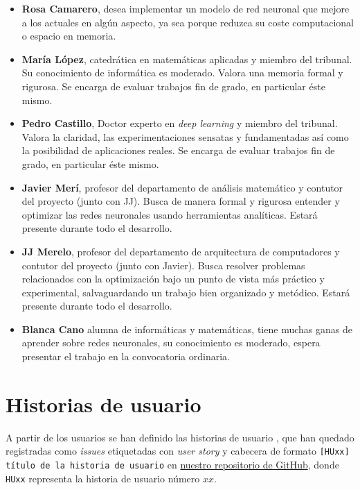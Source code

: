 \begin{itemize}

    \item \textbf{Rosa Camarero}, desea implementar un modelo de red neuronal que mejore a los actuales en algún aspecto, ya sea porque reduzca su coste computacional o espacio en memoria. 

    \item \textbf{María López}, catedrática en matemáticas aplicadas y miembro del tribunal. Su conocimiento
    de informática es moderado. Valora una memoria formal y rigurosa. Se encarga de evaluar trabajos fin de grado, en particular éste mismo.
    
    \item \textbf{Pedro Castillo}, Doctor experto en \textit{deep learning} y miembro del tribunal. Valora la claridad, las experimentaciones sensatas y fundamentadas así como la posibilidad de aplicaciones reales. Se encarga de evaluar trabajos fin de grado, en particular éste mismo. 
    
    \item \textbf{Javier Merí}, profesor del departamento de análisis matemático y contutor del proyecto (junto con JJ). Busca de manera formal y rigurosa entender y optimizar las redes neuronales usando herramientas analíticas. Estará presente durante todo el desarrollo. 
    
    \item   \textbf{JJ Merelo}, profesor del departamento de arquitectura de computadores y contutor del proyecto (junto con Javier). 
    Busca resolver problemas relacionados con la optimización bajo un punto de vista más práctico y experimental, salvaguardando un trabajo bien organizado y metódico. Estará presente durante todo el desarrollo. 

    \item \textbf{Blanca Cano} alumna de informáticas y matemáticas, tiene muchas ganas de aprender sobre redes 
    neuronales, su conocimiento es moderado, espera presentar el trabajo en la convocatoria ordinaria. 

\end{itemize}

\section{Historias de usuario}   \label{ch:metodología_personas_historias_de_usuario}

A partir de los usuarios se han definido las historias de usuario \cite{UserStories}, que han quedado registradas 
como \textit{issues} etiquetadas con \textit{user story} y cabecera de formato
\texttt{[HUxx] título de la historia de usuario}  en \href{https://github.com/BlancaCC/TFG-Estudio-de-las-redes-neuronales}{nuestro repositorio 
de GitHub},
 donde \texttt{HUxx} representa
la historia de usuario número $xx$.   

